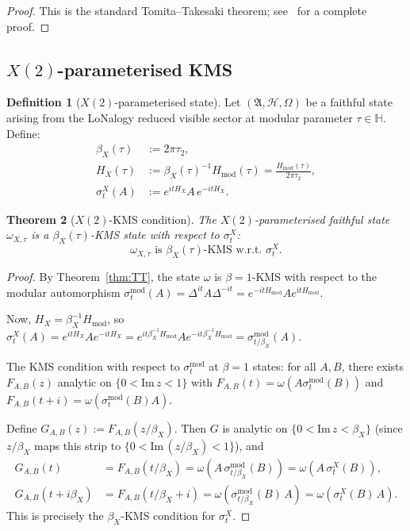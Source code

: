 \documentclass[12pt]{article}
\theoremstyle{plain}
\newtheorem{theorem}{Theorem}[section]
\theoremstyle{definition}
\newtheorem{definition}[theorem]{Definition}
\numberwithin{equation}{section}
\newcommand{\HH}{\mathbb{H}}
\begin{document}
\begin{proof}
This is the standard Tomita--Takesaki theorem; see~\cite{BratteliRobinson}
for a complete proof.
\end{proof}

\subsection{$X(2)$-parameterised KMS}

\begin{definition}[$X(2)$-parameterised state]
Let $(\mathfrak{A},\mathcal{H},\Omega)$ be a faithful state
arising from the LoNalogy reduced visible sector at modular
parameter $\tau\in\HH$.  Define:
\begin{align}
\beta_X(\tau) &:= 2\pi\tau_2,\\
H_X(\tau) &:= \beta_X(\tau)^{-1}H_{\mathrm{mod}}(\tau)
= \frac{H_{\mathrm{mod}}(\tau)}{2\pi\tau_2},\\
\sigma_t^X(A) &:= e^{itH_X}A\,e^{-itH_X}.
\end{align}
\end{definition}

\begin{theorem}[$X(2)$-KMS condition]\label{thm:kms}
The $X(2)$-parameterised faithful state $\omega_{X,\tau}$ is a
$\beta_X(\tau)$-KMS state with respect to $\sigma_t^X$:
\begin{equation}
\boxed{\omega_{X,\tau}\text{ is }\beta_X(\tau)\text{-KMS w.r.t.\ }\sigma_t^X.}
\end{equation}
\end{theorem}

\begin{proof}
By Theorem~\ref{thm:TT}, the state $\omega$ is $\beta=1$-KMS with
respect to the modular automorphism
$\sigma_t^{\mathrm{mod}}(A)=\Delta^{it}A\Delta^{-it}=e^{-itH_{\mathrm{mod}}}Ae^{itH_{\mathrm{mod}}}$.

Now, $H_X=\beta_X^{-1}H_{\mathrm{mod}}$, so
$\sigma_t^X(A)=e^{itH_X}Ae^{-itH_X}
=e^{it\beta_X^{-1}H_{\mathrm{mod}}}Ae^{-it\beta_X^{-1}H_{\mathrm{mod}}}
=\sigma_{t/\beta_X}^{\mathrm{mod}}(A)$.

The KMS condition with respect to $\sigma_t^{\mathrm{mod}}$ at $\beta=1$
states: for all $A,B$, there exists $F_{A,B}(z)$ analytic on
$\{0<\mathrm{Im}\,z<1\}$ with
$F_{A,B}(t)=\omega(A\sigma_t^{\mathrm{mod}}(B))$ and
$F_{A,B}(t+i)=\omega(\sigma_t^{\mathrm{mod}}(B)A)$.

Define $G_{A,B}(z):=F_{A,B}(z/\beta_X)$.  Then $G$ is analytic on
$\{0<\mathrm{Im}\,z<\beta_X\}$ (since $z/\beta_X$ maps this strip to
$\{0<\mathrm{Im}\,(z/\beta_X)<1\}$), and
\begin{align}
G_{A,B}(t) &= F_{A,B}(t/\beta_X)
= \omega\!\left(A\,\sigma_{t/\beta_X}^{\mathrm{mod}}(B)\right)
= \omega\!\left(A\,\sigma_t^X(B)\right),\\
G_{A,B}(t+i\beta_X) &= F_{A,B}(t/\beta_X+i)
= \omega\!\left(\sigma_{t/\beta_X}^{\mathrm{mod}}(B)\,A\right)
= \omega\!\left(\sigma_t^X(B)\,A\right).
\end{align}
This is precisely the $\beta_X$-KMS condition for $\sigma_t^X$.
\end{proof}
\end{document}
